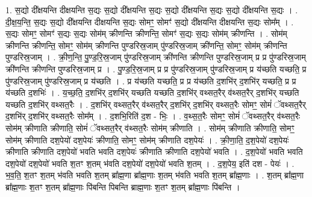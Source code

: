 \documentclass[17pt]{extarticle}
\begin{document}
1. स॒द्यो दी᳚क्षयन्ति दीक्षयन्ति स॒द्यः स॒द्यो दी᳚क्षयन्ति स॒द्यः स॒द्यो दी᳚क्षयन्ति स॒द्यः स॒द्यो दी᳚क्षयन्ति स॒द्यः । . दी॒क्ष॒य॒न्ति॒ स॒द्यः स॒द्यो दी᳚क्षयन्ति दीक्षयन्ति स॒द्यः सोमꣳ॒॒ सोमꣳ॑ स॒द्यो दी᳚क्षयन्ति दीक्षयन्ति स॒द्यः सोम᳚म् । . स॒द्यः सोमꣳ॒॒ सोमꣳ॑ स॒द्यः स॒द्यः सोम॑म् क्रीणन्ति क्रीणन्ति॒ सोमꣳ॑ स॒द्यः स॒द्यः सोम॑म् क्रीणन्ति । . सोम॑म् क्रीणन्ति क्रीणन्ति॒ सोमꣳ॒॒ सोम॑म् क्रीणन्ति पुण्डरिस्र॒जाम् पु॑ण्डरिस्र॒जाम् क्री॑णन्ति॒ सोमꣳ॒॒ सोम॑म् क्रीणन्ति पुण्डरिस्र॒जाम् । . क्री॒ण॒न्ति॒ पु॒ण्ड॒रि॒स्र॒जाम् पु॑ण्डरिस्र॒जाम् क्री॑णन्ति क्रीणन्ति पुण्डरिस्र॒जाम् प्र प्र पु॑ण्डरिस्र॒जाम् क्री॑णन्ति क्रीणन्ति पुण्डरिस्र॒जाम् प्र । . पु॒ण्ड॒रि॒स्र॒जाम् प्र प्र पु॑ण्डरिस्र॒जाम् पु॑ण्डरिस्र॒जाम् प्र य॑च्छति यच्छति॒ प्र पु॑ण्डरिस्र॒जाम् पु॑ण्डरिस्र॒जाम् प्र य॑च्छति । . प्र य॑च्छति यच्छति॒ प्र प्र य॑च्छति द॒शभि॑र् द॒शभि॑र् यच्छति॒ प्र प्र य॑च्छति द॒शभिः॑ । . य॒च्छ॒ति॒ द॒शभि॑र् द॒शभि॑र् यच्छति यच्छति द॒शभि॑र् वथ्सत॒रैर् व॑थ्सत॒रैर् द॒शभि॑र् यच्छति यच्छति द॒शभि॑र् वथ्सत॒रैः । . द॒शभि॑र् वथ्सत॒रैर् व॑थ्सत॒रैर् द॒शभि॑र् द॒शभि॑र् वथ्सत॒रैः सोमꣳ॒॒ सोमं॑ ॅवथ्सत॒रैर् द॒शभि॑र् द॒शभि॑र् वथ्सत॒रैः सोम᳚म् । . द॒शभि॒रिति॑ द॒श - भिः॒ । . व॒थ्स॒त॒रैः सोमꣳ॒॒ सोमं॑ ॅवथ्सत॒रैर् व॑थ्सत॒रैः सोम॑म् क्रीणाति क्रीणाति॒ सोमं॑ ॅवथ्सत॒रैर् व॑थ्सत॒रैः सोम॑म् क्रीणाति । . सोम॑म् क्रीणाति क्रीणाति॒ सोमꣳ॒॒ सोम॑म् क्रीणाति दश॒पेयो॑ दश॒पेयः॑ क्रीणाति॒ सोमꣳ॒॒ सोम॑म् क्रीणाति दश॒पेयः॑ । . क्री॒णा॒ति॒ द॒श॒पेयो॑ दश॒पेयः॑ क्रीणाति क्रीणाति दश॒पेयो॑ भवति भवति दश॒पेयः॑ क्रीणाति क्रीणाति दश॒पेयो॑ भवति । . द॒श॒पेयो॑ भवति भवति दश॒पेयो॑ दश॒पेयो॑ भवति श॒तꣳ श॒तम् भ॑वति दश॒पेयो॑ दश॒पेयो॑ भवति श॒तम् । . द॒श॒पेय॒ इति॑ दश - पेयः॑ । . भ॒व॒ति॒ श॒तꣳ श॒तम् भ॑वति भवति श॒तम् ब्रा᳚ह्म॒णा ब्रा᳚ह्म॒णाः श॒तम् भ॑वति भवति श॒तम् ब्रा᳚ह्म॒णाः । . श॒तम् ब्रा᳚ह्म॒णा ब्रा᳚ह्म॒णाः श॒तꣳ श॒तम् ब्रा᳚ह्म॒णाः पि॑बन्ति पिबन्ति ब्राह्म॒णाः श॒तꣳ श॒तम् ब्रा᳚ह्म॒णाः पि॑बन्ति । \newline
\end{document}
